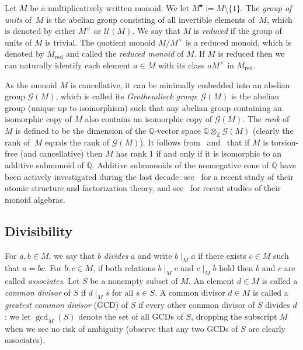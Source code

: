 \documentclass[10pt]{amsart}
\theoremstyle{definition}
\theoremstyle{remark}
\numberwithin{equation}{section}
\newcommand{\qq}{\mathbb{Q}}
\newcommand{\zz}{\mathbb{Z}}
\newcommand{\gp}{\mathcal{G}}
\newcommand{\uu}{\mathcal{U}}
\begin{document}
Let $M$ be a multiplicatively written monoid. We let $M^\bullet := M \setminus \{1\}$. The \emph{group of units} of~$M$ is the abelian group consisting of all invertible elements of~$M$, which is denoted by either $M^\times$ or $\uu(M)$. We say that $M$ is \emph{reduced} if the group of units of $M$ is trivial. The quotient monoid $M/M^\times$ is a reduced monoid, which is denoted by $M_{\text{red}}$ and called the \emph{reduced monoid} of $M$. If $M$ is reduced then we can naturally identify each element $a \in M$ with its class $aM^\times$ in $M_{\text{red}}$.
\smallskip

As the monoid $M$ is cancellative, it can be minimally embedded into an abelian group $\gp(M)$, which is called its \emph{Grothendieck group}: $\gp(M)$ is the abelian group (unique up to isomorphism) such that any abelian group containing an isomorphic copy of $M$ also contains an isomorphic copy of $\gp(M)$. The \emph{rank} of $M$ is defined to be the dimension of the $\qq$-vector space $\qq \otimes_\zz \gp(M)$ (clearly the rank of~$M$ equals the rank of $\gp(M)$). It follows from~\cite[Section~24]{lF70} and~\cite[Theorem~2.9]{rG84} that if $M$ is torsion-free (and cancellative) then $M$ has rank $1$ if and only if it is isomorphic to an additive submonoid of $\qq$. Additive submonoids of the nonnegative cone of $\qq$ have been actively investigated during the last decade: see~\cite{CGGP25} for a recent study of their atomic structure and factorization theory, and see~\cite{BGLZ24,GG25,GGP25,GR25} for recent studies of their monoid algebras.

\medskip
\subsection{Divisibility}

For $a,b \in M$, we say that $b$ \emph{divides} $a$ and write $b \mid_M a$ if there exists $c \in M$ such that $a = bc$. For $b,c \in M$, if both relations $b \mid_M c$ and $c \mid_M b$ hold then $b$ and $c$ are called \emph{associates}. Let $S$ be a nonempty subset of $M$. An element $d \in M$ is called a \emph{common divisor} of $S$ if $d \mid_M s$ for all $s \in S$. A common divisor $d \in M$ is called a \emph{greatest common divisor} (GCD) of $S$ if every other common divisor of $S$ divides $d$: we let $\gcd_M(S)$ denote the set of all GCDs of $S$, dropping the subscript $M$ when we see no risk of ambiguity (observe that any two GCDs of $S$ are clearly associates).
\smallskip
\end{document}

